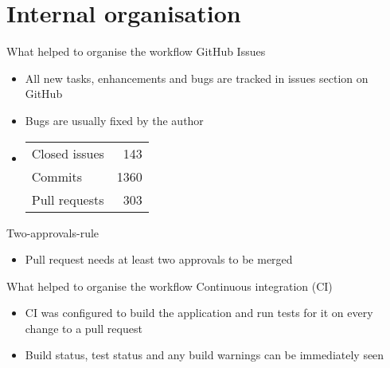 \section{Internal organisation}
\begin{frame}{What helped to organise the workflow}
GitHub Issues
\begin{itemize}
	\item{All new tasks, enhancements and bugs are tracked in issues section on GitHub}
	\item{Bugs are usually fixed by the author}
	\item
\begin{tabular}{l r}
Closed issues & 143\\
Commits & 1360\\
Pull requests & 303\\
\end{tabular}
\end{itemize}

Two-approvals-rule
\begin{itemize}
	\item{Pull request needs at least two approvals to be merged}
\end{itemize}
\end{frame}

\begin{frame}{What helped to organise the workflow}
Continuous integration (CI) 
\begin{itemize}
	\item{CI was configured to build the application and run tests for it on every change to a pull request}
	\item{Build status, test status and any build warnings can be immediately seen}
\end{itemize}
\end{frame}
